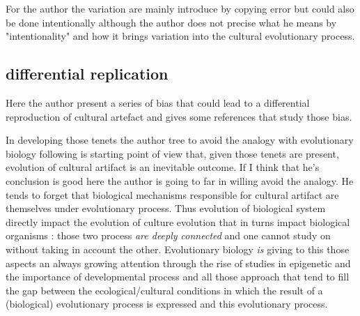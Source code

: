 \documentclass[]{article}
\begin{document}
For the author the variation are mainly introduce by copying error but could also be done intentionally although the author does not precise what he means by "intentionality" and how it brings variation into the cultural evolutionary process. 


\subsection{differential replication}

Here the author present a series of bias that could lead to a differential reproduction of cultural artefact and gives some references that study those bias.


In developing those tenets the author tree to avoid the analogy with evolutionary biology following is starting point of view that, given those tenets are present, evolution of cultural artifact is an inevitable outcome. If I think that he's conclusion is good here the author is going to far in willing avoid the analogy. He tends to forget that biological mechanisms responsible for cultural artifact are themselves under evolutionary process. Thus evolution of biological system directly impact the evolution of culture evolution that in turns impact biological organisms : those two process \emph{are deeply connected} and one cannot study on without taking in account the other. Evolutionary biology \emph{is} giving to this those aspects an always growing attention through the rise of studies in epigenetic and the importance of developmental process and all those approach that tend to fill the gap between the ecological/cultural conditions in which the result of a (biological) evolutionary process is expressed and this evolutionary process.
\end{document}
